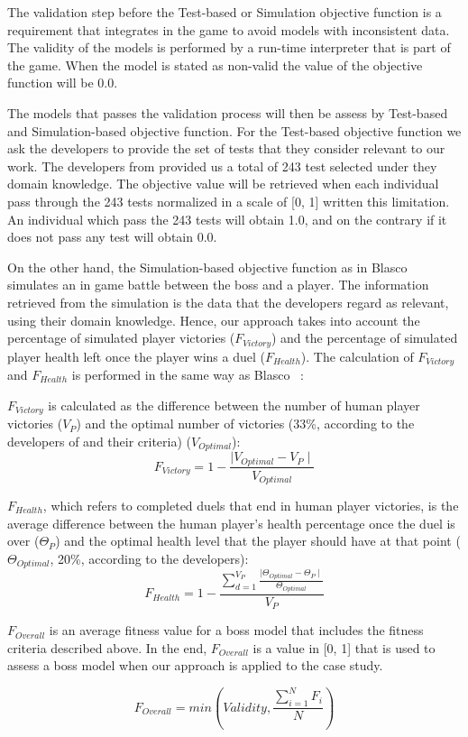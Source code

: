 The validation step before the Test-based or Simulation objective function is a requirement that \CaseStudy{} integrates in the game to avoid models with inconsistent data. The validity of the models is performed by a run-time interpreter that is part of the game. When the model is stated as non-valid the value of the objective function will be 0.0.

The models that passes the validation process will then be assess by Test-based and Simulation-based objective function.
For the Test-based objective function we ask the developers to provide the set of tests that they consider relevant to our work. The developers from \CaseStudy{} provided us a total of 243 test selected under they domain knowledge. The objective value will be retrieved when each individual pass through the 243 tests normalized in a scale of [0, 1] written this limitation. An individual which pass the 243 tests will obtain 1.0, and on the contrary if it does not pass any test will obtain 0.0.

On the other hand, the Simulation-based objective function as in Blasco \etal~\cite{blasco2021evolutionary} simulates an in game battle between the boss and a player. The information retrieved from the simulation is the data that the developers regard as relevant, using their domain knowledge. Hence, our approach takes into account the percentage of simulated player victories ($F_{Victory}$) and the percentage of simulated player health left once the player wins a duel ($F_{Health}$).
The calculation of $F_{Victory}$ and $F_{Health}$ is performed in the same
way as Blasco \etal~\cite{blasco2021evolutionary}:

$F_{Victory}$ is calculated as the difference between the number of human player victories ($V_{P}$) and the optimal number of victories (33\%, according to the developers of \CaseStudy{} and their criteria) ($V_{Optimal}$):
\begin{equation}
F_{Victory} = 1 -\frac{\mid V_{Optimal} - V_{P} \mid}{ V_{Optimal}}
\end{equation}

$F_{Health}$, which refers to completed duels that end in human player victories, is the average difference between the human player's health percentage once the duel is over ($\Theta_{P}$) and the optimal health level that the player should have at that point ($\Theta_{Optimal}$, 20\%, according to the developers):
\begin{equation}
F_{Health} = 1 - \frac{\sum\limits_{d=1}^{V_{P}}\frac{\mid \Theta_{Optimal} - \Theta_{P} \mid}{ \Theta_{Optimal}}}{V_{P}}
\end{equation}

$F_{Overall}$ is an average fitness value for a boss model that includes the fitness criteria described above. In the end, $F_{Overall}$ is a value in [0, 1] that is used to assess a boss model when our \ApproachName{} approach is applied to the \CaseStudy{} case study.

\begin{equation}
F_{Overall} = min( Validity, \frac{\sum\limits_{i=1}^{N}F_{i}}{N} )
\end{equation}
